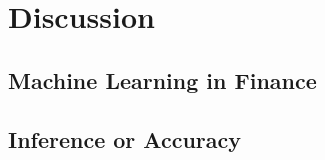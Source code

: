 \chapter{Discussion}
\label{sec:org69ce5a2}

\section{Machine Learning in Finance}
\label{sec:org7597oa8}

\section{Inference or Accuracy}
\label{sec:org77i7oa8}
